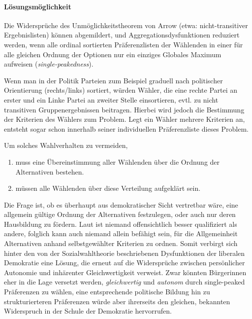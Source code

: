 \paragraph{Lösungsmöglichkeit}

Die Widersprüche des Unmöglichkeitstheorem von Arrow (etwa: nicht-transitiver Ergebnislisten) können abgemildert, und Aggregationsdysfunktionen reduziert werden, wenn alle ordinal sortierten Präferenzlisten der Wählenden in einer für alle gleichen Ordnung der Optionen nur ein einziges Globales Maximum aufweisen (\emph{single-peakedness}).

Wenn man in der Politik Parteien zum Beispiel graduell nach politischer Orientierung (rechts/links) sortiert, würden Wähler, die eine rechte Partei an erster und ein Linke Partei an zweiter Stelle einsortieren, evtl. zu nicht transitiven Gruppenergebnissen beitragen.
Hierbei wird jedoch die Bestimmung der Kriterien des Wählers zum Problem.
Legt ein Wähler mehrere Kriterien an, entsteht sogar schon innerhalb seiner individuellen Präferenzliste dieses Problem.

Um solches Wahlverhalten zu vermeiden,

\begin{enumerate}
	\item muss eine Übereinstimmung aller Wählenden über die Ordnung der Alternativen bestehen.

	\item müssen alle Wählenden über diese Verteilung aufgeklärt sein.
\end{enumerate}

Die Frage ist, ob es überhaupt aus demokratischer Sicht vertretbar wäre, eine allgemein gültige Ordnung der Alternativen festzulegen, oder auch nur deren Hausbildung zu fördern.
Laut \citeauthor{Dahl-1989-aa} ist niemand offensichtlich besser qualifiziert als andere, folglich kann auch niemand allein befähigt sein, für die Allgemeinheit Alternativen anhand selbstgewählter Kriterien zu ordnen.
Somit verbirgt sich hinter den von der Sozialwahltheorie beschriebenen Dysfunktionen der liberalen Demokratie eine Lösung, die erneut auf die Widersprüche zwischen persönlicher Autonomie und inhärenter Gleichwertigkeit verweist.
Zwar könnten Bürgerinnen eher in die Lage versetzt werden, \emph{gleichwertig} und \emph{autonom} durch single-peaked Präferenzen zu wählen, eine entsprechende politische Bildung hin zu strukturierteren Präferenzen würde aber ihrerseits den gleichen, bekannten Widerspruch in der Schule der Demokratie hervorrufen.

